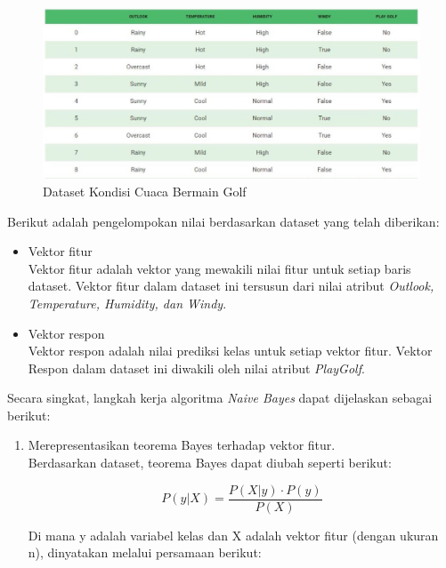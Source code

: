 \documentclass[a4paper,twoside]{article}
\begin{document}
\begin{enumerate}
\begin{figure}[H]
	\centering
	\includegraphics[scale=0.6]{naive_bayes1}
	\caption{Dataset Kondisi Cuaca Bermain Golf}
	\label{fig:naive_bayes1}
\end{figure}

\noindent Berikut adalah pengelompokan nilai berdasarkan dataset yang telah diberikan:

\begin{itemize}

\item 
Vektor fitur\\
Vektor fitur adalah vektor yang mewakili nilai fitur untuk setiap baris dataset. Vektor fitur dalam dataset ini tersusun dari nilai atribut \textit{Outlook, Temperature, Humidity, dan Windy}.

\item
Vektor respon\\
Vektor respon adalah nilai prediksi kelas untuk setiap vektor fitur. Vektor Respon dalam dataset ini diwakili oleh nilai atribut \textit{PlayGolf}.

\end{itemize}


\noindent Secara singkat, langkah kerja algoritma \textit{Naive Bayes} dapat dijelaskan sebagai berikut:

\begin{enumerate}
\item Merepresentasikan teorema Bayes terhadap vektor fitur.\\
Berdasarkan dataset, teorema Bayes dapat diubah seperti berikut:

\begin{equation}
P(y|X) = \frac{P(X|y) \cdot P(y)}{P(X)}
\end{equation}

Di mana y adalah variabel kelas dan X adalah vektor fitur (dengan ukuran n), dinyatakan melalui persamaan berikut:


\end{enumerate}
\end{enumerate}
\end{document}
